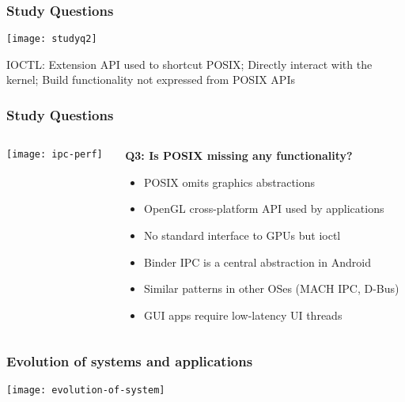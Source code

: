 \begin{frame}[plain]	
	\frametitle{Study Questions}
	\centering
	\texttt{[image: studyq2]}
	
	IOCTL: Extension API used to shortcut POSIX; Directly interact with the kernel; Build functionality not expressed from POSIX APIs
	
\end{frame}


\begin{frame}[plain]	
	\frametitle{Study Questions}
	\large
	
	
		\begin{columns}
		
		\begin{column}{.4\textwidth}
	
		\centering
	\texttt{[image: ipc-perf]}
	\end{column}

	\begin{column}{.6\textwidth}
	
	\textbf{Q3: Is POSIX missing any functionality?}
	\begin{itemize}\normalsize
		\item POSIX omits graphics abstractions
		
		\item OpenGL cross-platform API used by applications
						
		\item No standard interface to GPUs but ioctl
		\item Binder IPC is a central abstraction in Android
		\item Similar patterns in other OSes (MACH IPC, D-Bus)
		\item GUI apps require low-latency UI threads
		
	\end{itemize}
\end{column}
\end{columns}


\end{frame}


\begin{frame}[plain]	
	\frametitle{Evolution of systems and applications}

	\centering
	\texttt{[image: evolution-of-system]}
	
\end{frame}

